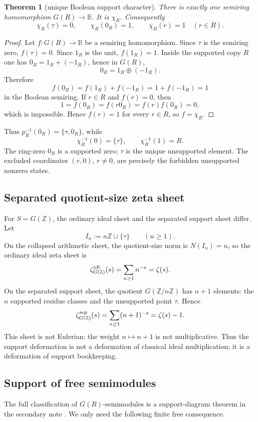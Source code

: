 \documentclass[11pt]{article}
\newtheorem{theorem}{Theorem}[section]
\newcommand{\Z}{\mathbb Z}
\newcommand{\B}{\mathbb B}
\begin{document}
\begin{theorem}[unique Boolean support character]
There is exactly one semiring homomorphism $G(R)\to\B$.  It is $\chi_R$.
Consequently
\[
\chi_R(\tau)=0,
\qquad
\chi_R(0_R)=1,
\qquad
\chi_R(r)=1\quad(r\in R).
\]
\end{theorem}

\begin{proof}
Let $f:G(R)\to\B$ be a semiring homomorphism.  Since $\tau$ is the semiring zero,
$f(\tau)=0$.  Since $1_R$ is the unit, $f(1_R)=1$.  Inside the supported copy $R$ one
has $0_R=1_R+(-1_R)$, hence in $G(R)$,
\[
0_R=1_R\oplus(-1_R).
\]
Therefore
\[
f(0_R)=f(1_R)+f(-1_R)=1+f(-1_R)=1
\]
in the Boolean semiring.  If $r\in R$ and $f(r)=0$, then
\[
1=f(0_R)=f(r0_R)=f(r)f(0_R)=0,
\]
which is impossible.  Hence $f(r)=1$ for every $r\in R$, so $f=\chi_R$.
\end{proof}

Thus $p_R^{-1}(0_R)=\{\tau,0_R\}$, while
\[
\chi_R^{-1}(0)=\{\tau\},\qquad \chi_R^{-1}(1)=R.
\]
The ring-zero $0_R$ is a supported zero; $\tau$ is the unique unsupported element.
The excluded coordinates $(r,0)$, $r\ne0$, are precisely the forbidden unsupported
nonzero states.


\subsection{Separated quotient-size zeta sheet}

For $S=G(\Z)$, the ordinary ideal sheet and the separated support sheet differ.
Let
\[
I_n:=n\Z\cup\{\tau\}\qquad (n\ge 1).
\]
On the collapsed arithmetic sheet, the quotient-size norm is $N(I_n)=n$, so the
ordinary ideal zeta sheet is
\[
\zeta^{\rm idl}_{G(\Z)}(s)=\sum_{n\ge1}n^{-s}=\zeta(s).
\]
On the separated support sheet, the quotient $G(\Z/n\Z)$ has $n+1$ elements: the
$n$ supported residue classes and the unsupported point $\tau$.  Hence
\[
\zeta^{\rm sep}_{G(\Z)}(s)
=
\sum_{n\ge1}(n+1)^{-s}
=
\zeta(s)-1.
\]
This sheet is not Eulerian: the weight $n\mapsto n+1$ is not multiplicative.  Thus
the support deformation is not a deformation of classical ideal multiplication; it is
a deformation of support bookkeeping.

\subsection{Support of free semimodules}

The full classification of $G(R)$-semimodules is a support-diagram theorem in the
secondary note \cite{SZ2}.  We only need the following finite free consequence.
\end{document}
